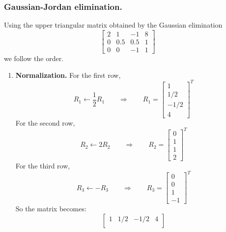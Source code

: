 \documentclass[../../../main.tex]{subfiles}
\begin{document}
\subsubsection{Gaussian-Jordan elimination.}
Using the upper triangular matrix obtained by the Gaussian elimination
\begin{equation*}
    \begin{bmatrix}
        2 & 1   & -1  & 8 \\
        0 & 0.5 & 0.5 & 1 \\
        0 & 0   & -1  & 1
    \end{bmatrix}
\end{equation*}
we follow the order.
\begin{enumerate}
    \item \textbf{Normalization.}
          For the first row,
          \begin{equation*}
              R_1 \leftarrow \frac{1 }{2 }R_1\qquad\Rightarrow\qquad R_1=
              \begin{bmatrix}
                  1 \\1/2\\-1/2\\4
              \end{bmatrix}^{T}
          \end{equation*}
          For the second row,
          \begin{equation*}
              R_2 \leftarrow 2R_2 \qquad\Rightarrow\qquad R_2=
              \begin{bmatrix}
                  0 \\1\\1\\2
              \end{bmatrix}^{T}
          \end{equation*}
          For the third row,
          \begin{equation*}
              R_3 \leftarrow -R_3 \qquad\Rightarrow\qquad R_3=
              \begin{bmatrix}
                  0 \\0\\1\\-1
              \end{bmatrix}^{T}
          \end{equation*}
          So the matrix becomes:
          \begin{equation*}
              \begin{bmatrix}
                  1 & 1/2 & -1/2 & 4 \\

\end{bmatrix}
\end{equation*}
\end{enumerate}
\end{document}
